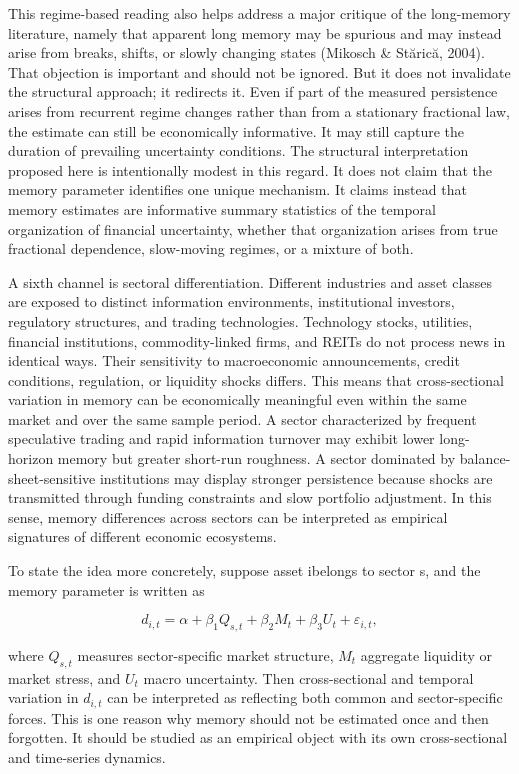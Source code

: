 \documentclass[12pt]{article}
\begin{document}
This regime-based reading also helps address a major critique of the long-memory literature, namely that apparent long memory may be spurious and may instead arise from breaks, shifts, or slowly changing states (Mikosch \& St\u{a}ric\u{a}, 2004). That objection is important and should not be ignored. But it does not invalidate the structural approach; it redirects it. Even if part of the measured persistence arises from recurrent regime changes rather than from a stationary fractional law, the estimate can still be economically informative. It may still capture the duration of prevailing uncertainty conditions. The structural interpretation proposed here is intentionally modest in this regard. It does not claim that the memory parameter identifies one unique mechanism. It claims instead that memory estimates are informative summary statistics of the temporal organization of financial uncertainty, whether that organization arises from true fractional dependence, slow-moving regimes, or a mixture of both.

A sixth channel is sectoral differentiation. Different industries and asset classes are exposed to distinct information environments, institutional investors, regulatory structures, and trading technologies. Technology stocks, utilities, financial institutions, commodity-linked firms, and REITs do not process news in identical ways. Their sensitivity to macroeconomic announcements, credit conditions, regulation, or liquidity shocks differs. This means that cross-sectional variation in memory can be economically meaningful even within the same market and over the same sample period. A sector characterized by frequent speculative trading and rapid information turnover may exhibit lower long-horizon memory but greater short-run roughness. A sector dominated by balance-sheet-sensitive institutions may display stronger persistence because shocks are transmitted through funding constraints and slow portfolio adjustment. In this sense, memory differences across sectors can be interpreted as empirical signatures of different economic ecosystems.

To state the idea more concretely, suppose asset ibelongs to sector s, and the memory parameter is written as

\[d_{i,t} = \alpha + \beta_1 Q_{s,t} + \beta_2 M_t + \beta_3 U_t + \varepsilon_{i,t},\]

where $Q_{s,t}$ measures sector-specific market structure, $M_t$ aggregate liquidity or market stress, and $U_t$ macro uncertainty. Then cross-sectional and temporal variation in $d_{i,t}$ can be interpreted as reflecting both common and sector-specific forces. This is one reason why memory should not be estimated once and then forgotten. It should be studied as an empirical object with its own cross-sectional and time-series dynamics.
\end{document}
